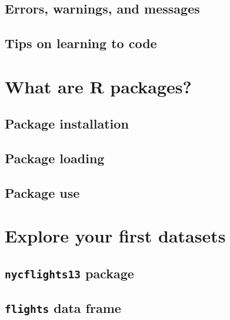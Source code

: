 \documentclass[
  12pt, krantz2,
]{krantz}
\begin{document}
\hypertarget{errors-warnings-and-messages}{%
\subsection{Errors, warnings, and messages}\label{errors-warnings-and-messages}}

\hypertarget{tips-on-learning-to-code}{%
\subsection{Tips on learning to code}\label{tips-on-learning-to-code}}

\hypertarget{packages}{%
\section{What are R packages?}\label{packages}}

\hypertarget{package-installation}{%
\subsection{Package installation}\label{package-installation}}

\hypertarget{package-loading}{%
\subsection{Package loading}\label{package-loading}}

\hypertarget{package-use}{%
\subsection{Package use}\label{package-use}}

\hypertarget{nycflights13}{%
\section{Explore your first datasets}\label{nycflights13}}

\hypertarget{nycflights13-package}{%
\subsection{\texorpdfstring{\texttt{nycflights13} package}{nycflights13 package}}\label{nycflights13-package}}

\hypertarget{flights-data-frame}{%
\subsection{\texorpdfstring{\texttt{flights} data frame}{flights data frame}}\label{flights-data-frame}}
\end{document}
